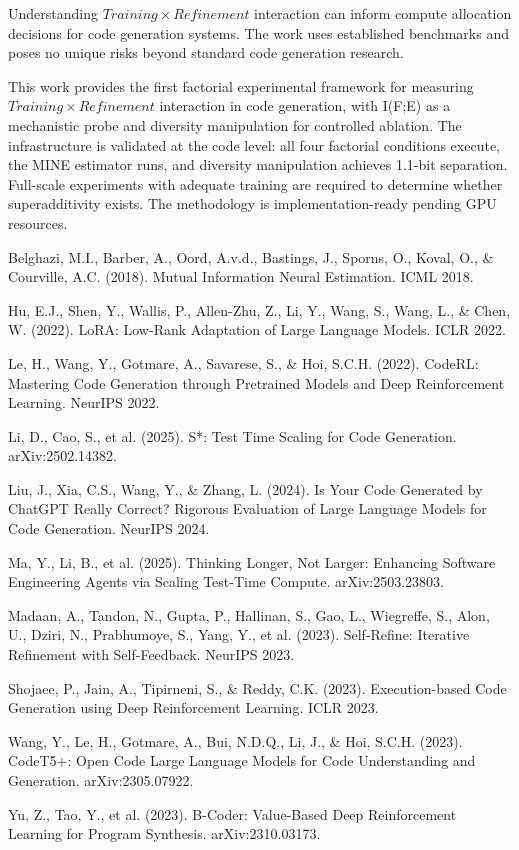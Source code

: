 
Understanding $Training\times Refinement$ interaction can inform compute allocation decisions for code generation systems. The work uses established benchmarks and poses no unique risks beyond standard code generation research.



This work provides the first factorial experimental framework for measuring $Training\times Refinement$ interaction in code generation, with I(F;E) as a mechanistic probe and diversity manipulation for controlled ablation. The infrastructure is validated at the code level: all four factorial conditions execute, the MINE estimator runs, and diversity manipulation achieves 1.1-bit separation. Full-scale experiments with adequate training are required to determine whether superadditivity exists. The methodology is implementation-ready pending GPU resources.



Belghazi, M.I., Barber, A., Oord, A.v.d., Bastings, J., Sporns, O., Koval, O., \& Courville, A.C. (2018). Mutual Information Neural Estimation. ICML 2018.

Hu, E.J., Shen, Y., Wallis, P., Allen-Zhu, Z., Li, Y., Wang, S., Wang, L., \& Chen, W. (2022). LoRA: Low-Rank Adaptation of Large Language Models. ICLR 2022.

Le, H., Wang, Y., Gotmare, A., Savarese, S., \& Hoi, S.C.H. (2022). CodeRL: Mastering Code Generation through Pretrained Models and Deep Reinforcement Learning. NeurIPS 2022.

Li, D., Cao, S., et al. (2025). S*: Test Time Scaling for Code Generation. arXiv:2502.14382.

Liu, J., Xia, C.S., Wang, Y., \& Zhang, L. (2024). Is Your Code Generated by ChatGPT Really Correct? Rigorous Evaluation of Large Language Models for Code Generation. NeurIPS 2024.

Ma, Y., Li, B., et al. (2025). Thinking Longer, Not Larger: Enhancing Software Engineering Agents via Scaling Test-Time Compute. arXiv:2503.23803.

Madaan, A., Tandon, N., Gupta, P., Hallinan, S., Gao, L., Wiegreffe, S., Alon, U., Dziri, N., Prabhumoye, S., Yang, Y., et al. (2023). Self-Refine: Iterative Refinement with Self-Feedback. NeurIPS 2023.

Shojaee, P., Jain, A., Tipirneni, S., \& Reddy, C.K. (2023). Execution-based Code Generation using Deep Reinforcement Learning. ICLR 2023.

Wang, Y., Le, H., Gotmare, A., Bui, N.D.Q., Li, J., \& Hoi, S.C.H. (2023). CodeT5+: Open Code Large Language Models for Code Understanding and Generation. arXiv:2305.07922.

Yu, Z., Tao, Y., et al. (2023). B-Coder: Value-Based Deep Reinforcement Learning for Program Synthesis. arXiv:2310.03173.
